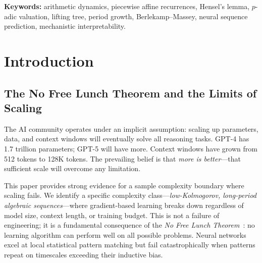 \documentclass[11pt]{article}
\theoremstyle{plain}
\theoremstyle{definition}
\begin{document}
\begin{abstract}
Testing $p$-adic positional encodings designed to capture hierarchical structure yields no improvement (1.0\% vs 1.0\% baseline), confirming simple architectural modifications may not immediately overcome the coverage barrier.

This quantifies fundamental limits for gradient-based learning on long-period algebraic sequences, with implications for cryptographic predictability. All code is open-source with full reproducibility. No cryptographic security claims are made.
\end{abstract}

\vspace{4pt}
\noindent\textbf{Keywords:} arithmetic dynamics, piecewise affine recurrences, Hensel's lemma, $p$-adic valuation, lifting tree, period growth, Berlekamp--Massey, neural sequence prediction, mechanistic interpretability.

\newpage\tableofcontents\newpage

\section{Introduction}
\label{sec:intro}

\subsection{The No Free Lunch Theorem and the Limits of Scaling}

The AI community operates under an implicit assumption: scaling up parameters, data, and context windows will eventually solve all reasoning tasks. GPT-4 has 1.7 trillion parameters; GPT-5 will have more. Context windows have grown from 512 tokens to 128K tokens. The prevailing belief is that \emph{more is better}—that sufficient scale will overcome any limitation.

This paper provides strong evidence for a sample complexity boundary where scaling fails. We identify a specific complexity class—\emph{low-Kolmogorov, long-period algebraic sequences}—where gradient-based learning breaks down regardless of model size, context length, or training budget. This is not a failure of engineering; it is a fundamental consequence of the \emph{No Free Lunch Theorem}~\citep{Wolpert1997}: no learning algorithm can perform well on all possible problems. Neural networks excel at local statistical pattern matching but fail catastrophically when patterns repeat on timescales exceeding their inductive bias.
\end{document}
